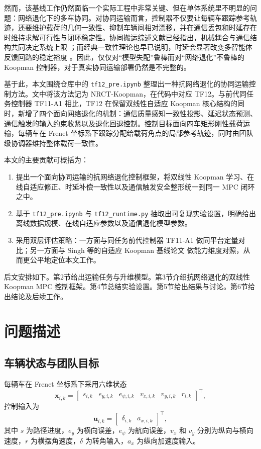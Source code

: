 \documentclass[twocolumn,3p,times,procedia]{elsarticle}
\newcommand{\methodname}{NRCT-Koopman}
\newcommand{\tfone}{TF11-A1}
\newcommand{\tftwo}{TF12}
\begin{document}
然而，该基线工作仍然面临一个实际工程中非常关键、但在单体系统里不明显的问题：网络退化下的多车协同。对协同运输而言，控制器不仅要让每辆车跟踪参考轨迹，还要维护载荷的几何一致性、抑制车辆间相对漂移，并在通信丢包和时延存在时维持求解可行性与闭环稳定性。协同搬运综述文献已经指出，机械耦合与通信结构共同决定系统上限 \cite{ebel2024cooperative}；而经典一致性理论也早已说明，时延会显著改变多智能体反馈回路的稳定裕度 \cite{olfatisaber2004consensus}。因此，仅仅对“模型失配”鲁棒而对“网络退化”不鲁棒的 Koopman 控制器，对于真实协同运输部署仍然是不完整的。

基于此，本文围绕仓库中的 \texttt{tf12\_pre.ipynb} 整理出一种抗网络退化的协同运输控制方法。文中将该方法记为 \methodname{}，在代码中对应 \tftwo{}。与前代同任务控制器 \tfone{} 相比，\tftwo{} 在保留双线性自适应 Koopman 核心结构的同时，新增了四个面向网络退化的机制：通信质量感知一致性投影、延迟状态预测、通信触发的输入约束收紧以及退化回退控制。控制目标面向四车矩形刚性载荷运输，每辆车在 Frenet 坐标系下跟踪分配给载荷角点的局部参考轨迹，同时由团队级协调器维持整体载荷一致性。

本文的主要贡献可概括为：
\begin{enumerate}
    \item 提出一个面向协同运输的抗网络退化控制框架，将双线性 Koopman 学习、在线自适应修正、时延补偿一致性以及通信触发安全整形统一到同一 MPC 闭环之中。
    \item 基于 \texttt{tf12\_pre.ipynb} 与 \texttt{tf12\_runtime.py} 抽取出可复现实验设置，明确给出离线数据规模、在线自适应参数以及通信退化模型参数。
    \item 采用双层评估策略：一方面与同任务前代控制器 \tfone{} 做同平台定量对比；另一方面与 Singh 等的自适应 Koopman 基线论文 \cite{singh2024adaptive} 做能力维度对照，从而更公平地定位本文工作。
\end{enumerate}

后文安排如下。第2节给出运输任务与升维模型。第3节介绍抗网络退化的双线性 Koopman MPC 控制框架。第4节总结实验设置。第5节给出结果与讨论。第6节给出结论及后续工作。

\section{问题描述}
\subsection{车辆状态与团队目标}
每辆车在 Frenet 坐标系下采用六维状态
\begin{equation}
\bm{x}_{i,k}=\begin{bmatrix}s_{i,k} & e_{y,i,k} & e_{\psi,i,k} & v_{x,i,k} & v_{y,i,k} & r_{i,k}\end{bmatrix}^{\top},
\end{equation}
控制输入为
\begin{equation}
\bm{u}_{i,k}=\begin{bmatrix}\delta_{i,k} & a_{x,i,k}\end{bmatrix}^{\top},
\end{equation}
其中 $s$ 为路径进度，$e_y$ 为横向误差，$e_{\psi}$ 为航向误差，$v_x$ 和 $v_y$ 分别为纵向与横向速度，$r$ 为横摆角速度，$\delta$ 为转角输入，$a_x$ 为纵向加速度输入。
\end{document}
